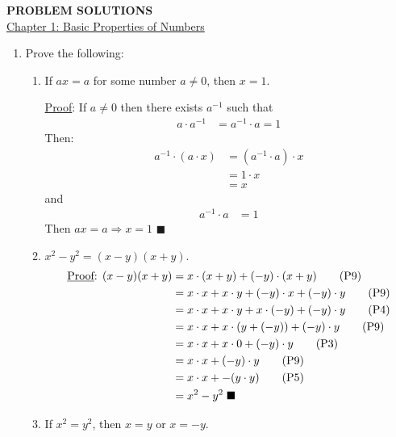 \documentclass[12pt]{article}
\newcommand{\qed}{\blacksquare}
\begin{document}
\textbf{PROBLEM SOLUTIONS}\\

\underline{Chapter 1: Basic Properties of Numbers}
\begin{enumerate}

\item Prove the following:
\begin{enumerate}
\item If $ax = a$ for some number $a \neq 0$, then $x = 1$.

\underline{Proof}: If $a \neq 0$ then there exists $a^{-1}$ such that 
\begin{align} 
a \cdot a^{-1} &= a^{-1} \cdot a = 1 \tag{P7}
\end{align}
Then:
\begin{align}
a^{-1}\cdot (a\cdot x) &= (a^{-1}\cdot a) \cdot x \tag{P5}\\
			     &= 1 \cdot x \tag{P7}\\
			     &= x \tag{P6}
\end{align}
and
\begin{align}
a^{-1}\cdot a &= 1 \tag{P7}
\end{align}
Then $ax = a \Rightarrow x = 1$ $\qed$

\item $x^2 - y^2 = (x - y)(x + y).$
\begin{align}
\text{\underline{Proof}: } (x - y)(x + y) &= x \cdot (x + y) + (-y) \cdot (x + y) \tag{P9}\\
		    &= x \cdot x + x \cdot y + (-y) \cdot x + (-y) \cdot y \tag{P9}\\
		    &= x \cdot x + x \cdot y + x \cdot (-y) + (-y) \cdot y \tag{P4}\\
		    &= x \cdot x + x \cdot (y + (-y)) + (-y) \cdot y \tag{P9}\\
		    &= x \cdot x + x \cdot 0 + (-y) \cdot y \tag{P3}\\
		    &= x \cdot x + (-y) \cdot y \tag{P9}\\
		    &= x \cdot x + -(y \cdot y) \tag{P5}\\
		    &= x^2 - y^2 \hspace{.1cm} \blacksquare \notag 	    
\end{align}

\item If $x^2 = y^2$, then $x = y$ or $x = -y$.


\end{enumerate}
\end{enumerate}
\end{document}
